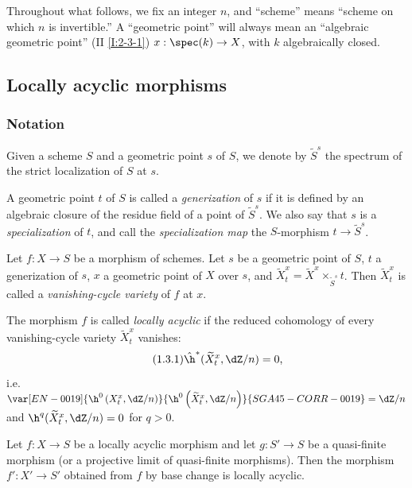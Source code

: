 Throughout what follows, we fix an integer $n$, and “scheme” means
“scheme on which $n$ is invertible.” A “geometric point” will always mean
an “algebraic geometric point” (II \ref{I:2-3-1})
$x:\spec(k)\to X$, with $k$ algebraically closed.

\subsection{Locally acyclic morphisms}\label{I:5-1}

\subsubsection{Notation}\label{I:5-1-1}

Given a scheme $S$ and a geometric point $s$ of $S$, we denote by
$\widetilde S^s$ the spectrum of the strict localization of $S$ at $s$.

\begin{definition}\label{I:5-1-2}
A geometric point $t$ of $S$ is called a \emph{generization} of $s$ if
it is defined by an algebraic closure of the residue field of a point of
$\widetilde S^s$. We also say that $s$ is a \emph{specialization} of
$t$, and call the \emph{specialization map} the $S$-morphism
$t\to\widetilde S^s$.
\end{definition}

\begin{definition}\label{I:5-1-3}
Let $f:X\to S$ be a morphism of schemes. Let $s$ be a geometric point
of $S$, $t$ a generization of $s$, $x$ a geometric point of $X$ over
$s$, and
$\widetilde X_t^x=\widetilde X^x\times_{\widetilde S^s}t$. Then
$\widetilde X_t^x$ is called a \emph{vanishing-cycle variety} of $f$ at
$x$.

The morphism $f$ is called \emph{locally acyclic} if the reduced
cohomology of every vanishing-cycle variety $\widetilde X_t^x$ vanishes:
\begin{equation*}\tag{1.3.1}\label{I:eq:5-1-3-1}
  \hat\h^*(\widetilde X_t^x,\dZ/n) = 0\text{,}
\end{equation*}
i.e. $\var[EN-0019]{\h^0\left(X_t^x,\dZ/n\right)}{\h^0\left(\widetilde X_t^x,\dZ/n\right)}{SGA45-CORR-0019}=\dZ/n$ and
$\h^q(\widetilde X_t^x,\dZ/n)=0$ for $q>0$.
\end{definition}

\begin{lemma}\label{I:5-1-4}
Let $f:X\to S$ be a locally acyclic morphism and let $g:S'\to S$ be a
quasi-finite morphism (or a projective limit of quasi-finite morphisms).
Then the morphism $f':X'\to S'$ obtained from $f$ by base change is
locally acyclic.
\end{lemma}

